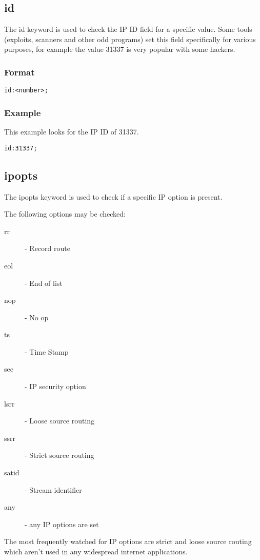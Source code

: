 \documentclass[english]{report}
\begin{document}
\subsection{id}

The id keyword is used to check the IP ID field for a specific value.  Some
tools (exploits, scanners and other odd programs) set this field specifically
for various purposes, for example the value 31337 is very popular with some
hackers. 

\subsubsection{Format}

\begin{verbatim}
id:<number>;
\end{verbatim}

\subsubsection{Example}

This example looks for the IP ID of 31337.
\begin{verbatim}
id:31337;
\end{verbatim}

\subsection{ipopts}

The ipopts keyword is used to check if a specific IP option is present.

The following options may be checked:
\begin{description}
\item [rr] - Record route 
\item [eol] - End of list 
\item [nop] - No op 
\item [ts] - Time Stamp 
\item [sec] - IP security option 
\item [lsrr] - Loose source routing 
\item [ssrr] - Strict source routing 
\item [satid] - Stream identifier
\item [any] - any IP options are set
\end{description}

The most frequently watched for IP options are strict and loose source
routing which aren't used in any widespread internet applications.
\end{document}
